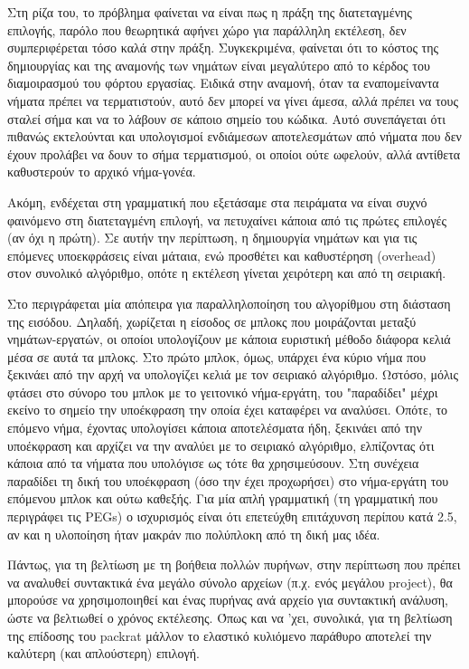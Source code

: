 Στη ρίζα του, το πρόβλημα φαίνεται να είναι πως η πράξη της διατεταγμένης επιλογής, παρόλο που θεωρητικά αφήνει χώρο για παράλληλη εκτέλεση, δεν συμπεριφέρεται τόσο καλά στην πράξη.
Συγκεκριμένα, φαίνεται ότι το κόστος της δημιουργίας και της αναμονής των νημάτων είναι μεγαλύτερο από το κέρδος του διαμοιρασμού του φόρτου εργασίας.
Ειδικά στην αναμονή, όταν τα εναπομείναντα νήματα πρέπει να τερματιστούν, αυτό δεν μπορεί να γίνει άμεσα, αλλά πρέπει να τους σταλεί σήμα και να το λάβουν σε κάποιο σημείο του κώδικα.
Αυτό συνεπάγεται ότι πιθανώς εκτελούνται και υπολογισμοί ενδιάμεσων αποτελεσμάτων από νήματα που δεν έχουν προλάβει να δουν το σήμα τερματισμού, οι οποίοι ούτε ωφελούν, αλλά αντίθετα καθυστερούν το αρχικό νήμα-γονέα.

Ακόμη, ενδέχεται στη γραμματική που εξετάσαμε στα πειράματα να είναι συχνό φαινόμενο στη διατεταγμένη επιλογή, να πετυχαίνει κάποια από τις πρώτες επιλογές (αν όχι η πρώτη).
Σε αυτήν την περίπτωση, η δημιουργία νημάτων και για τις επόμενες υποεκφράσεις είναι μάταια, ενώ προσθέτει και καθυστέρηση (overhead) στον συνολικό αλγόριθμο, οπότε η εκτέλεση γίνεται χειρότερη και από τη σειριακή.

Στο \cite{Fowler2009} περιγράφεται μία απόπειρα για παραλληλοποίηση του αλγορίθμου στη διάσταση της εισόδου.
Δηλαδή, χωρίζεται η είσοδος σε μπλοκς που μοιράζονται μεταξύ νημάτων-εργατών, οι οποίοι υπολογίζουν με κάποια ευριστική μέθοδο διάφορα κελιά μέσα σε αυτά τα μπλοκς.
Στο πρώτο μπλοκ, όμως, υπάρχει ένα κύριο νήμα που ξεκινάει από την αρχή να υπολογίζει κελιά με τον σειριακό αλγόριθμο.
Ωστόσο, μόλις φτάσει στο σύνορο του μπλοκ με το γειτονικό νήμα-εργάτη, του "παραδίδει" μέχρι εκείνο το σημείο την υποέκφραση την οποία έχει καταφέρει να αναλύσει.
Οπότε, το επόμενο νήμα, έχοντας υπολογίσει κάποια αποτελέσματα ήδη, ξεκινάει από την υποέκφραση και αρχίζει να την αναλύει με το σειριακό αλγόριθμο, ελπίζοντας ότι κάποια από τα νήματα που υπολόγισε ως τότε θα χρησιμεύσουν.
Στη συνέχεια παραδίδει τη δική του υποέκφραση (όσο την έχει προχωρήσει) στο νήμα-εργάτη του επόμενου μπλοκ και ούτω καθεξής. Για μία απλή γραμματική (τη γραμματική που περιγράφει τις PEGs) ο ισχυρισμός είναι ότι επετεύχθη επιτάχυνση περίπου κατά 2.5, αν και η υλοποίηση ήταν μακράν πιο πολύπλοκη από τη δική μας ιδέα.

Πάντως, για τη βελτίωση με τη βοήθεια πολλών πυρήνων, στην περίπτωση που πρέπει να αναλυθεί συντακτικά ένα μεγάλο σύνολο αρχείων (π.χ. ενός μεγάλου project), θα μπορούσε να χρησιμοποιηθεί και ένας πυρήνας ανά αρχείο για συντακτική ανάλυση, ώστε να βελτιωθεί ο χρόνος εκτέλεσης.
Όπως και να 'χει, συνολικά, για τη βελτίωση της επίδοσης του packrat μάλλον το ελαστικό κυλιόμενο παράθυρο αποτελεί την καλύτερη (και απλούστερη) επιλογή.

